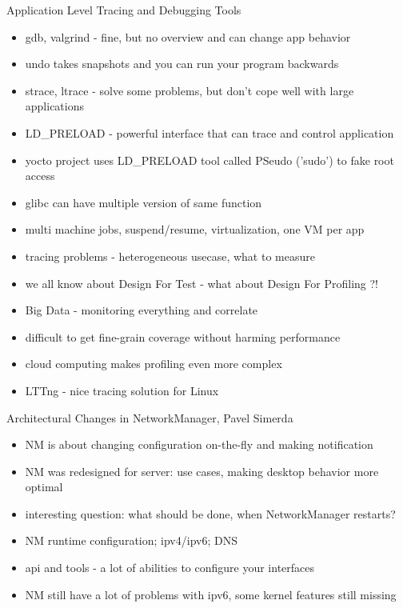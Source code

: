 \documentclass[aspectratio=169]{beamer}
\begin{document}
\begin{frame}{Application Level Tracing and Debugging Tools}
  \begin{itemize}
  \item gdb, valgrind - fine, but no overview and can change app behavior
  \item undo takes snapshots and you can run your program backwards
  \item strace, ltrace - solve some problems, but don't cope well with large applications
  \item LD\_PRELOAD - powerful interface that can trace and control application
  \item yocto project uses LD\_PRELOAD tool called PSeudo ('sudo') to fake root access
  \item glibc can have multiple version of same function
  \item multi machine jobs, suspend/resume, virtualization, one VM per app
  \item tracing problems - heterogeneous usecase, what to measure
  \item we all know about Design For Test - what about Design For Profiling ?!
  \item Big Data - monitoring everything and correlate
  \item difficult to get fine-grain coverage without harming performance
  \item cloud computing makes profiling even more complex
  \item LTTng - nice tracing solution for Linux
  \end{itemize}
\end{frame}

\begin{frame}{Architectural Changes in NetworkManager, Pavel Simerda}
  \begin{itemize}
  \item NM is about changing configuration on-the-fly and making notification
  \item NM was redesigned for server: use cases, making desktop behavior more optimal
  \item interesting question: what should be done, when NetworkManager restarts?
  \item NM runtime configuration; ipv4/ipv6; DNS
  \item api and tools - a lot of abilities to configure your interfaces
  \item NM still have a lot of problems with ipv6, some kernel features still missing
  \end{itemize}
\end{frame}
\end{document}
